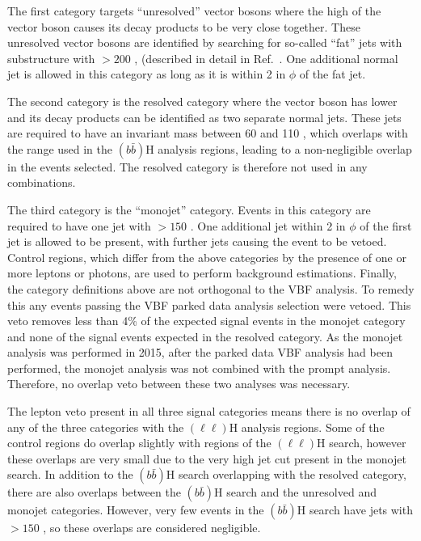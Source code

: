 The first category targets ``unresolved'' vector bosons where the high \pt of the vector boson causes its decay products to be very close together. These unresolved vector bosons are identified by searching for so-called ``fat'' jets with substructure with \pt$>200$ \GeV, (described in detail in Ref.~\cite{CMS-PAS-EXO-12-055}. One additional normal jet is allowed in this category as long as it is within 2 in $\phi$ of the fat jet.

The second category is the resolved category where the vector boson has lower \pt and its decay products can be identified as two separate normal jets. These jets are required to have an invariant mass between 60 and 110 \GeV, which overlaps with the range used in the \PZ$(b\bar{b})$H analysis regions, leading to a non-negligible overlap in the events selected. The resolved category is therefore not used in any combinations.

The third category is the ``monojet'' category. Events in this category are required to have one jet with \pt$>150$ \GeV. One additional jet within 2 in $\phi$ of the first jet is allowed to be present, with further jets causing the event to be vetoed. Control regions, which differ from the above categories by the presence of one or more leptons or photons, are used to perform background estimations. Finally, the category definitions above are not orthogonal to the \ac{VBF} analysis. To remedy this any events passing the \ac{VBF} parked data analysis selection were vetoed. This veto removes less than 4\% of the expected signal events in the monojet category and none of the signal events expected in the resolved category. As the monojet analysis was performed in 2015, after the parked data \ac{VBF} analysis had been performed, the monojet analysis was not combined with the prompt analysis. Therefore, no overlap veto between these two analyses was necessary.

The lepton veto present in all three signal categories means there is no overlap of any of the three categories with the \PZ$(\ell\ell)$H analysis regions. Some of the control regions do overlap slightly with regions of the \PZ$(\ell\ell)$H search, however these overlaps are very small due to the very high jet \pt cut present in the monojet search. In addition to the \PZ$(b\bar{b})$H search overlapping with the resolved category, there are also overlaps between the \PZ$(b\bar{b})$H search and the  unresolved and monojet categories. However, very few events in the \PZ$(b\bar{b})$H search have jets with \pt$>150$ \GeV, so these overlaps are considered negligible.

